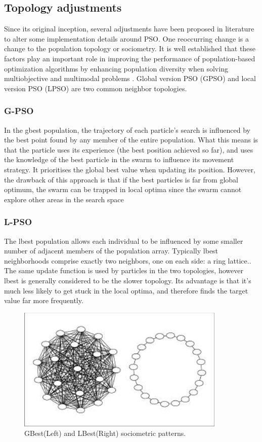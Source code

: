 \documentclass[oneside,12pt]{book}
\begin{document}
\subsection{Topology adjustments}
Since its original inception, several adjustments have been proposed in literature to alter some implementation details around PSO. One reoccurring change is a change to the population topology or sociometry. It is well established that these factors play an important role in improving the performance of population-based optimization algorithms by enhancing population diversity when solving multiobjective and multimodal problems \cite{LYNN201824}. Global version PSO (GPSO) and local version PSO (LPSO) are two common neighbor topologies. 
\subsubsection{G-PSO}
In  the  gbest  population,  the trajectory  of  each  particle’s  search  is  influenced  by  the best point found by any member of the entire population\cite{kennedy2002population}. What this means is that the particle uses its experience (the best position achieved so far), and uses the knowledge of the best particle in the swarm to influence its movement strategy. It prioritises the global best value when updating its position.  However, the drawback of this approach is that if the best particles is far  from global optimum, the  swarm can  be  trapped in  local optima since the swarm cannot explore other areas in the search space \cite{azab_hady_hefny_2016}

\subsubsection{L-PSO}
The  lbest  population  allows  each  individual  to  be  influenced  by  some  smaller  number  of  adjacent  members  of the  population  array. Typically  lbest  neighborhoods comprise exactly two neighbors, one on each side: a ring lattice.\cite{kennedy2002population}. The same update function is used by particles in the two topologies, however lbest is generally considered to be the slower topology. Its advantage is that it's much less likely to get stuck in the local optima, and therefore finds the target value far more frequently. 

\begin{figure}[H]
    \centering
    \includegraphics[scale=1.0]{Images/NeighborhoodTopology.png}
    \caption{GBest(Left) and LBest(Right) sociometric patterns.\protect\cite{kennedy2002population}}
    \label{fig:GBest(Left) and LBest(Right) sociometric patterns.}
\end{figure}
\end{document}
